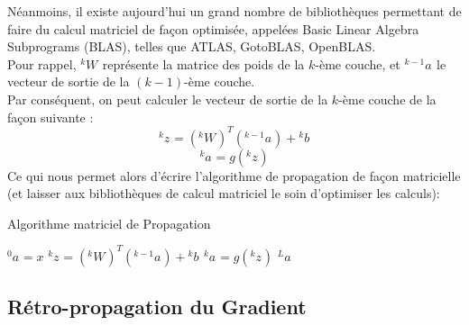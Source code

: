 \documentclass[10pt,a4paper]{report}
\newcommand{\lexp}[1]{\phantom{}^{#1}}
\newcommand{\elem}[4]{\lexp{#2}#1^{#3}_{#4}}
\begin{document}
			Néanmoins, il existe aujourd'hui un grand nombre de bibliothèques permettant de faire du calcul matriciel de façon optimisée, appelées Basic Linear Algebra Subprograms (BLAS), telles que ATLAS, GotoBLAS, OpenBLAS.\\
			Pour rappel, $\elem{W}{k}{}{}$ représente la matrice des poids de la $k$-ème couche, et $\elem{a}{k-1}{}{}$ le vecteur de sortie de la $(k-1)$-ème couche.\\
			Par conséquent, on peut calculer le vecteur de sortie de la $k$-ème couche de la façon suivante :
			$$\elem{z}{k}{}{} = (\elem{W}{k}{}{})^T(\elem{a}{k-1}{}{}) + \elem{b}{k}{}{}$$
			$$\elem{a}{k}{}{} = g(\elem{z}{k}{}{})$$
			Ce qui nous permet alors d'écrire l'algorithme de propagation de façon matricielle (et laisser aux bibliothèques de calcul matriciel le soin d'optimiser les calculs):
			\begin{algorithm}[H]
				\caption{Algorithme matriciel de Propagation}
				\begin{algorithmic}
				    \STATE $\elem{a}{0}{}{} = x$
				    	\STATE $\elem{z}{k}{}{} = (\elem{W}{k}{}{})^T(\elem{a}{k-1}{}{}) + \elem{b}{k}{}{}$
				    	\STATE $\elem{a}{k}{}{} = g(\elem{z}{k}{}{})$
				    \ENDFOR
				    \RETURN $\elem{a}{L}{}{}$
				\end{algorithmic}
			\end{algorithm}
			
		\subsection{Rétro-propagation du Gradient}
		
\end{document}
